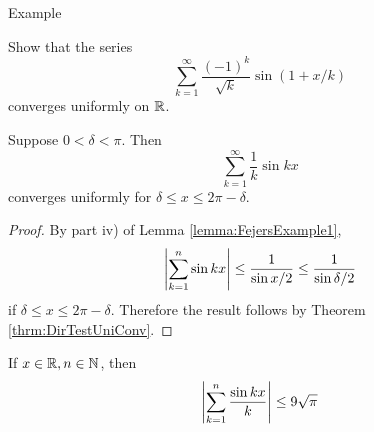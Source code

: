 \begin{section}{\fejers Example}

\begin{ex}
	Show that the series
		\begin{displaymath}
			\sum_{k=1}^\infty \frac{(-1)^k}{\sqrt{k}}
				\sin (1 + x/k)
		\end{displaymath}
	converges uniformly on $\mathbb{R}$.
\end{ex}

\begin{soln}
\end{soln}


\begin{lemma}
	Suppose $0 < \delta < \pi$. Then
		\begin{displaymath}
			\sum_{k=1}^\infty \frac{1}{k}\sin kx
		\end{displaymath}
	converges uniformly for $\delta \leq x \leq 2\pi-\delta$.
\end{lemma}

\begin{proof}
	By part iv) of Lemma \ref{lemma:FejersExample1},
		\begin{displaymath}
			\left \vert {\sum_{k=1}^n \sin kx} \right \vert \leq \frac{1}{\sin x/2}
				\leq \frac{1}{\sin \delta/2}
		\end{displaymath}
	if $\delta \leq x \leq 2\pi-\delta$. Therefore the result
	follows by Theorem \ref{thrm:DirTestUniConv}.
\end{proof}


\begin{lemma}\label{lemma:FejersExample3}
	If ${x} \in \mathbb{R}, {n} \in \mathbb{N}$, then
		\begin{displaymath}
			\left \vert {\sum_{k=1}^n \frac{\sin kx}{k}} \right \vert 
				\leq 9\sqrt{\pi}
		\end{displaymath}
\end{lemma}


\end{section}
